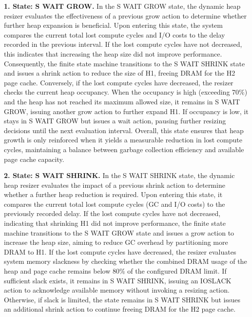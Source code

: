\textbf{1. State: S WAIT GROW.} 
In the S WAIT GROW state, the dynamic heap resizer evaluates the effectiveness of a previous grow action to determine whether further heap expansion is beneficial. Upon entering this state, the system compares the current total lost compute cycles and I/O costs to the delay recorded in the previous interval. If the lost compute cycles have not decreased, this indicates that increasing the heap size did not improve performance. Consequently, the finite state machine transitions to the S WAIT SHRINK state and issues a shrink action to reduce the size of H1, freeing DRAM for the H2 page cache. Conversely, if the lost compute cycles have decreased, the resizer checks the current heap occupancy. When the occupancy is high (exceeding 70\%) and the heap has not reached its maximum allowed size, it remains in S WAIT GROW, issuing another grow action to further expand H1. If occupancy is low, it stays in S WAIT GROW but issues a wait action, pausing further resizing decisions until the next evaluation interval. Overall, this state ensures that heap growth is only reinforced when it yields a measurable reduction in lost compute cycles, maintaining a balance between garbage collection efficiency and available page cache capacity.

\textbf{2. State: S WAIT SHRINK.} 
In the S WAIT SHRINK state, the dynamic heap resizer evaluates the impact of a previous shrink action to determine whether a further heap reduction is required. Upon entering this state, it compares the current total lost compute cycles (GC and I/O costs) to the previously recorded delay. If the lost compute cycles have not decreased, indicating that shrinking H1 did not improve performance, the finite state machine transitions to the S WAIT GROW state and issues a grow action to increase the heap size, aiming to reduce GC overhead by partitioning more DRAM to H1. If the lost compute cycles have decreased, the resizer evaluates system memory slackness by checking whether the combined DRAM usage of the heap and page cache remains below 80\% of the configured DRAM limit. If sufficient slack exists, it remains in S WAIT SHRINK, issuing an IOSLACK action to acknowledge available memory without invoking a resizing action. Otherwise, if slack is limited, the state remains in S WAIT SHRINK but issues an additional shrink action to continue freeing DRAM for the H2 page cache.

